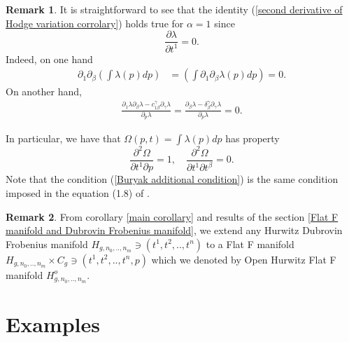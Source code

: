\documentclass{article}
\theoremstyle{definition}
\newtheorem{remark}{Remark}[section]
\begin{document}
\begin{remark}\label{remark triviality of t1}
It is straightforward to see that the identity (\ref{second derivative of Hodge variation corrolary}) holds true for $\alpha=1$ since 
\begin{equation*}
\frac{\partial \lambda}{\partial t^1}=0.
\end{equation*}
Indeed, on one hand
 \begin{equation*}
 \begin{split}
\partial_{1}\partial_{\beta}\left(\int\lambda(p)dp\right)&=\left(\int \partial_{1}\partial_{\beta}\lambda(p)dp\right)=0.
\end{split}
\end{equation*}
On another hand,
 \begin{equation*}
 \begin{split}
\frac{ \partial_{1}\lambda \partial_{\beta}\lambda-c_{1\beta}^{\gamma}\partial_{\gamma}\lambda}{ \partial_{p}\lambda} =\frac{  \partial_{\beta}\lambda-\delta_{\beta}^{\gamma}\partial_{\gamma}\lambda}{ \partial_{p}\lambda} =0.
\end{split}
\end{equation*}

In particular, we have that $\Omega(p,t)=\int \lambda(p)dp$ has property
\begin{equation}\label{Buryak  additional condition}
\frac{\partial^2\Omega}{\partial t^1\partial p}=1, \quad \frac{\partial^2\Omega}{\partial t^1\partial t^{\beta}}=0.
\end{equation}
Note that the condition (\ref{Buryak  additional condition}) is the same condition imposed in the equation (1.8) of \cite{Buryak}.

\end{remark}


\begin{remark}

From corollary \ref{main corollary} and results of the section \ref{Flat F manifold and Dubrovin Frobenius manifold}, we extend any Hurwitz Dubrovin Frobenius manifold $H_{g,n_0,..,n_m}\ni (t^1,t^2,..,t^n)$ to a Flat F manifold $H_{g,n_0,..,n_m}\times C_g \ni (t^1,t^2,..,t^n,p)$ which we denoted by Open Hurwitz Flat F manifold $H_{g,n_0,..,n_m}^o$.


\end{remark}



\section{Examples}
\end{document}

